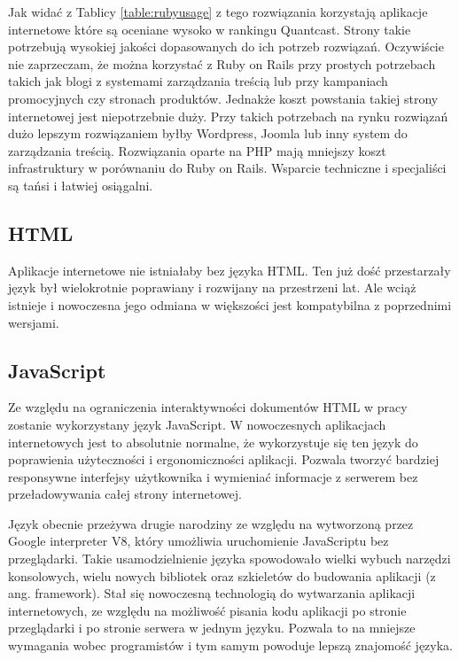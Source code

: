 Jak widać z Tablicy \ref{table:rubyusage} z tego rozwiązania korzystają aplikacje internetowe które są oceniane wysoko w rankingu Quantcast. Strony takie potrzebują wysokiej jakości dopasowanych do ich potrzeb rozwiązań. Oczywiście nie zaprzeczam, że można korzystać z Ruby on Rails przy prostych potrzebach takich jak blogi z systemami zarządzania treścią lub przy kampaniach promocyjnych czy stronach produktów. Jednakże koszt powstania takiej strony internetowej jest niepotrzebnie duży. Przy takich potrzebach na rynku rozwiązań dużo lepszym rozwiązaniem byłby Wordpress, Joomla lub inny system do zarządzania treścią. Rozwiązania oparte na PHP mają mniejszy koszt infrastruktury w porównaniu do Ruby on Rails. Wsparcie techniczne i specjaliści są tańsi i łatwiej osiągalni.

\subsection{HTML}
Aplikacje internetowe nie istniałaby bez języka HTML. Ten już dość przestarzały język był wielokrotnie poprawiany i rozwijany na przestrzeni lat. Ale wciąż istnieje i nowoczesna jego odmiana w większości jest kompatybilna z poprzednimi wersjami.

\subsection{JavaScript}
Ze względu na ograniczenia interaktywności dokumentów HTML w pracy zostanie wykorzystany język JavaScript. W nowoczesnych aplikacjach internetowych jest to absolutnie normalne, że wykorzystuje się ten język do poprawienia użyteczności i ergonomiczności aplikacji. Pozwala tworzyć bardziej responsywne interfejsy użytkownika i wymieniać informacje z serwerem bez przeładowywania całej strony internetowej.

Język obecnie przeżywa drugie narodziny ze względu na wytworzoną przez Google interpreter V8, który umożliwia uruchomienie JavaScriptu bez przeglądarki. Takie usamodzielnienie języka spowodowało wielki wybuch narzędzi konsolowych, wielu nowych bibliotek oraz szkieletów do budowania aplikacji (z ang. framework). Stał się nowoczesną technologią do wytwarzania aplikacji internetowych, ze względu na możliwość pisania kodu aplikacji po stronie przeglądarki i po stronie serwera w jednym języku. Pozwala to na mniejsze wymagania wobec programistów i tym samym powoduje lepszą znajomość języka.


